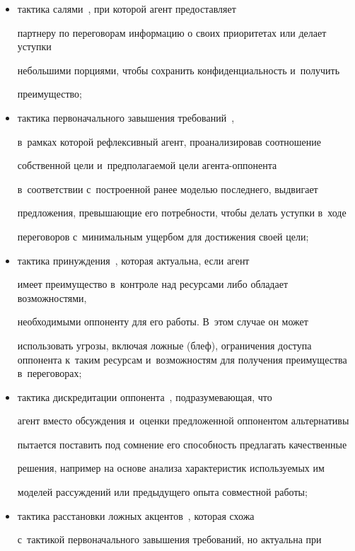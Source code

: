  \begin{itemize}


  \item тактика салями~\cite{13-lis, 14-lis}, при которой агент предоставляет 


партнеру по переговорам информацию о своих приоритетах или делает уступки 


небольшими порциями, чтобы сохранить конфиденциальность и~получить 


преимущество; 


  \item тактика первоначального завышения требований~\cite{13-lis, 14-lis}, 


в~рамках которой рефлексивный агент, проанализировав соотношение 


собственной цели и~предполагаемой цели аген\-та-оп\-по\-нен\-та 


в~соответствии с~построенной ранее моделью последнего, выдвигает 


предложения, превышающие его потребности, чтобы делать уступки в~ходе 


переговоров с~минимальным ущербом для достижения своей цели;


  \item тактика принуждения~\cite{13-lis, 14-lis}, которая актуальна, если агент 


имеет преимущество в~контроле над ресурсами либо обладает возможностями, 


необходимыми оппоненту для его работы. В~этом случае он может 


использовать угрозы, включая ложные (блеф), ограничения доступа оппонента к~таким ресурсам и~возможностям для получения преимущества в~переговорах; 


  \item тактика дискредитации оппонента~\cite{13-lis}, подразумевающая, что 


агент вмес\-то обсуждения и~оценки предложенной оппонентом альтернативы 


пытается поставить под сомнение его способность предлагать качественные 


решения, например на основе анализа характеристик используемых им 


моделей рассуждений или предыдущего опыта совместной работы;


  \item тактика расстановки ложных акцентов~\cite{13-lis}, которая схожа 


с~тактикой первоначального завышения требований, но актуальна при 



\end{itemize}

